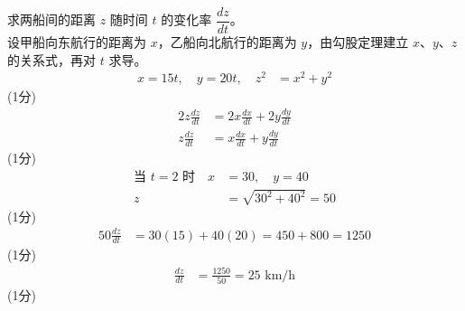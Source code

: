 \documentclass[12pt,a4paper]{exam-zh}
\begin{document}
\begin{solution}
    求两船间的距离 $z$ 随时间 $t$ 的变化率 $\dfrac{dz}{dt}$。 \\
    设甲船向东航行的距离为 $x$，乙船向北航行的距离为 $y$，由勾股定理建立 $x$、$y$、$z$ 的关系式，再对 $t$ 求导。
    \begin{align*}
        x=15t, \quad y=20t, \quad z^2 &= x^2+y^2
    \end{align*}
    \hfill (1分) \\
    \begin{align*}
        2z\frac{dz}{dt} &= 2x\frac{dx}{dt}+2y\frac{dy}{dt} \\
        z\frac{dz}{dt} &= x\frac{dx}{dt}+y\frac{dy}{dt}
    \end{align*}
    \hfill (1分) \\
    \begin{align*}
        \text{当 } t=2 \text{ 时} \quad x&=30,\quad y=40 \\
        z &= \sqrt{30^2+40^2} = 50
    \end{align*}
    \hfill (1分) \\
    \begin{align*}
        50\frac{dz}{dt} &= 30(15)+40(20) = 450+800 = 1250
    \end{align*}
    \hfill (1分) \\
    \begin{align*}
        \frac{dz}{dt} &= \frac{1250}{50} = 25\text{ km/h}
    \end{align*}
    \hfill (1分)
\end{solution}
\end{document}
